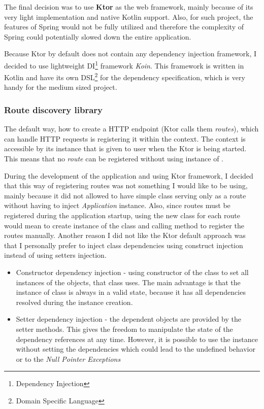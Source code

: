 \bigskip
The final decision was to use \textbf{Ktor} as the web framework,
mainly because of its very light implementation and native Kotlin support.
Also, for such project, 
the features of Spring would not be fully utilized
and therefore the complexity of Spring could potentially slowed down the entire application.

Because Ktor by default does not contain any dependency injection framework, 
I decided to use lightweight DI\footnote{Dependency Injection} framework \textit{Koin}\cite{koinGithub}.
This framework is written in Kotlin and have its own DSL\footnote{Domain Specific Language} for the dependency specification,
which is very handy for the medium sized project.

\subsubsection{Route discovery library}
The default way, how to create a HTTP endpoint (Ktor calls them \textit{routes}),
which can handle HTTP requests is registering it within the  context.
The  context is accessible by its instance that is given to user when the Ktor is being started.
This means that no \textit{route} can be registered without using instance of .

During the development of the application and using Ktor framework, 
I decided that this way of registering routes was not something I would like to be using,
mainly because it did not allowed to have simple class serving only as a route without having to inject \textit{Application} instance.
Also, 
since routes must be registered during the application startup,
using the new class for each route would mean to create instance of the class and calling method to register the routes manually.
Another reason I did not like the Ktor default approach was 
that I personally prefer to inject class dependencies using construct injection instead of using setters injection.
\begin{itemize}
	\item Constructor dependency injection - using constructor of the class to set all instances of the objects, that class uses.
	      The main advantage is that the instance of class is always in a valid state, because it has all dependencies resolved during the instance creation.
	\item Setter dependency injection - the dependent objects are provided by the setter methods.
	      This gives the freedom to manipulate the state of the dependency references at any time.
	      However, it is possible to use the instance without setting the dependencies which could lead to the undefined behavior or to the \textit{Null Pointer Exceptions}
\end{itemize}

